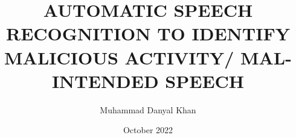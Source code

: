 

\clearpage{}  %



\title{AUTOMATIC SPEECH RECOGNITION TO IDENTIFY MALICIOUS ACTIVITY/ MAL-INTENDED SPEECH}
\author{Muhammad Danyal Khan}
\date{October 2022}

\makeapproval

\maketitle


\thesisAcceptanceCertificate





